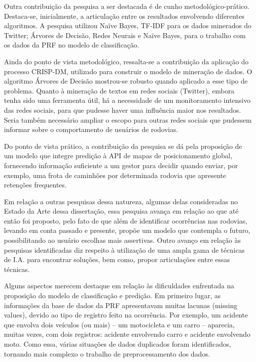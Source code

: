 Outra contribuição da pesquisa a ser destacada é de cunho metodológico-prático. Destaca-se, inicialmente, a articulação entre os resultados envolvendo diferentes algoritmos. A pesquisa utilizou Naïve Bayes, TF-IDF para os dados minerados do Twitter; 
Árvores de Decisão, Redes Neurais e  Naïve Bayes, para o trabalho com os dados da PRF no modelo de classificação.  

Ainda do ponto de vista metodológico, ressalta-se a contribuição da aplicação do processo CRISP-DM,
utilizado para construir o modelo de mineração de dados. 
O algoritmo Árvores de Decisão mostrou-se robusto quando aplicado a esse tipo de problema.
Quanto à mineração de textos em redes sociais (Twitter), embora tenha sido uma ferramenta útil, há a necessidade de um monitoramento intensivo das redes sociais, para que pudesse haver uma influência maior nos resultados. Seria também necessário ampliar o escopo para outras redes sociais que pudessem informar sobre o comportamento de usuários de rodovias.

Do ponto de vista prático, a contribuição da pesquisa se dá pela proposição de um modelo que integre predição à
API de mapas de posicionamento global, fornecendo informação suficiente a um gestor para decidir quando enviar,
por exemplo, uma frota de caminhões por determinada rodovia que apresente retenções frequentes.

Em relação a outras pesquisas dessa natureza, algumas delas consideradas no Estado da Arte dessa dissertação, essa pesquisa avança em relação ao que até então foi proposto, pelo fato de que além de identificar ocorrências nas rodovias, levando em conta passado e presente, propõe um modelo que contempla o futuro, possibilitando ao usuário escolhas mais assertivas. Outro avanço em relação às pesquisas identificadas diz respeito à utilização de uma ampla gama de técnicas de I.A. para encontrar soluções, bem como, propor articulações entre essas técnicas. 

Alguns aspectos merecem destaque em relação às dificuldades enfrentada na proposição do modelo de classificação e predição. Em primeiro lugar, as informações da base de dados da PRF apresentavam muitas lacunas (missing values), devido ao tipo de registro feito na ocorrência. Por exemplo, um acidente que envolva dois veículos (ou mais) -- um motocicleta e um carro -- aparecia, muitas vezes, com dois registros: acidente envolvendo carro e acidente envolvendo moto. Como essa, várias situações de dados duplicados foram identificados, tornando mais complexo o trabalho de preprocessamento dos dados.


